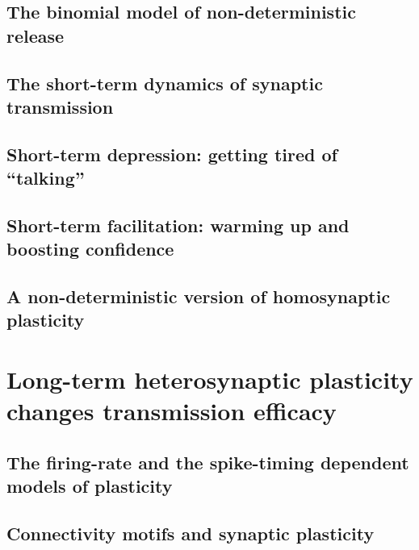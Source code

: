 		\subsection{The binomial model of non-deterministic release }
		\subsection{The short-term dynamics of synaptic transmission}
	\subsection{Short-term depression: getting tired of “talking”}
	\subsection{Short-term facilitation: warming up and boosting confidence}
	\subsection{A non-deterministic version of homosynaptic plasticity}
	    \section{Long-term heterosynaptic plasticity changes transmission efficacy}
		\subsection{The firing-rate and the spike-timing dependent models of plasticity}
		\subsection{Connectivity motifs and synaptic plasticity}


		
